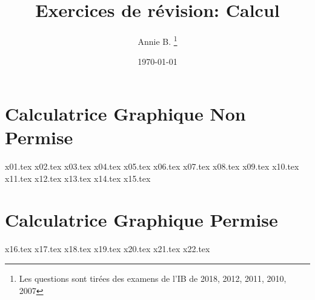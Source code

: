 \documentclass[10pt]{article}
\newcounter{question}
\begin{document}
 

\title{Exercices de révision: Calcul}
\author{Annie B. \thanks{Les questions sont tirées des examens de l’IB de 2018, 2012, 2011, 2010, 2007}}
\date{\today}
\maketitle

\newpage
\section*{\textbf{Calculatrice Graphique Non Permise}}
{x01.tex}
{x02.tex}
{x03.tex}
{x04.tex}
{x05.tex}
{x06.tex}
{x07.tex}
{x08.tex}
{x09.tex}
{x10.tex}
{x11.tex}
{x12.tex}
{x13.tex}
{x14.tex}
{x15.tex}
\section*{\textbf{Calculatrice Graphique Permise}}
{x16.tex}
{x17.tex}
{x18.tex}
{x19.tex}
{x20.tex}
{x21.tex}
{x22.tex}
\end{document}
